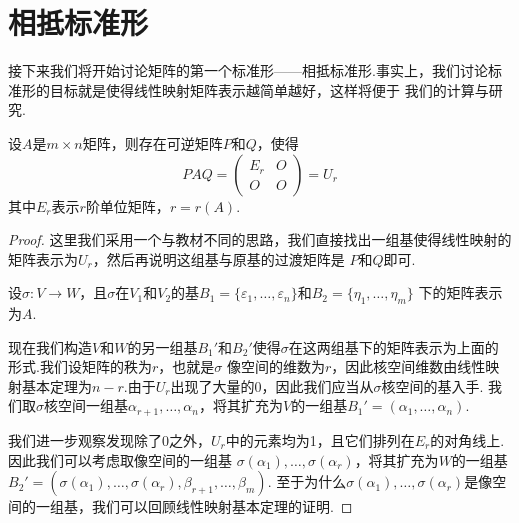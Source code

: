 \section{相抵标准形}
接下来我们将开始讨论矩阵的第一个标准形——相抵标准形.事实上，我们讨论标准形的目标就是使得线性映射矩阵表示越简单越好，这样将便于
我们的计算与研究.
\begin{theorem}\label{thm:11:相抵标准形}
    设$A$是$m\times n$矩阵，则存在可逆矩阵$P$和$Q$，使得
    \[PAQ=\begin{pmatrix}
        E_r & O \\ O & O
    \end{pmatrix}=U_r\]
    其中$E_r$表示$r$阶单位矩阵，$r=r(A)$.
\end{theorem}
\begin{proof}
    这里我们采用一个与教材不同的思路，我们直接找出一组基使得线性映射的矩阵表示为$U_r$，然后再说明这组基与原基的过渡矩阵是
    $P$和$Q$即可.

    设$\sigma:V\to W$，且$\sigma$在$V_1$和$V_2$的基$B_1=\{\varepsilon_1,\ldots,\varepsilon_n\}$和$B_2=\{\eta_1,\ldots,\eta_m\}$
    下的矩阵表示为$A$.

    现在我们构造$V$和$W$的另一组基$B_1'$和$B_2'$使得$\sigma$在这两组基下的矩阵表示为上面的形式.我们设矩阵的秩为$r$，也就是$\sigma$
    像空间的维数为$r$，因此核空间维数由线性映射基本定理为$n-r$.由于$U_r$出现了大量的0，因此我们应当从$\sigma$核空间的基入手.
    我们取$\sigma$核空间一组基$\alpha_{r+1},\ldots,\alpha_n$，将其扩充为$V$的一组基$B_1'=(\alpha_1,\ldots,\alpha_n)$.
    
    我们进一步观察发现除了0之外，$U_r$中的元素均为1，且它们排列在$E_r$的对角线上.因此我们可以考虑取像空间的一组基
    $\sigma(\alpha_1),\ldots,\sigma(\alpha_r)$，将其扩充为$W$的一组基$B_2'=(\sigma(\alpha_1),\ldots,\sigma(\alpha_r),\beta_{r+1},\ldots,\beta_m)$.
    至于为什么$\sigma(\alpha_1),\ldots,\sigma(\alpha_r)$是像空间的一组基，我们可以回顾线性映射基本定理的证明.


\end{proof}
